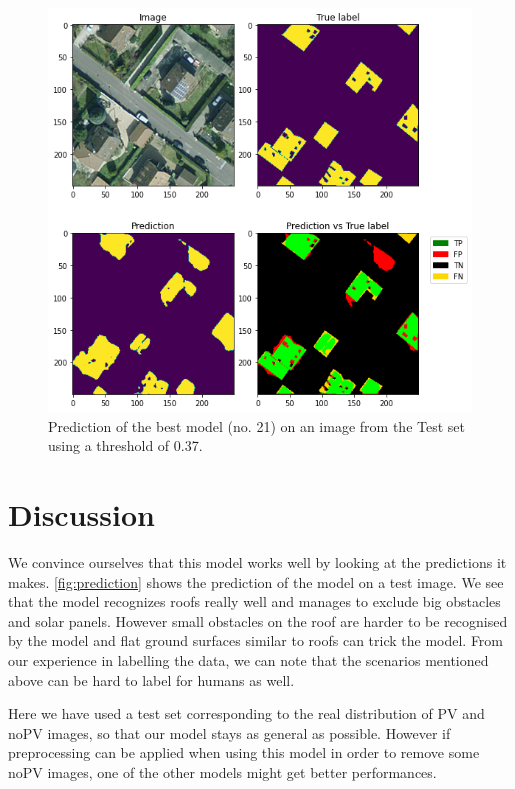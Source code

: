 \documentclass[10pt,conference]{IEEEtran}
\begin{document}
\begin{figure}[tbp]
    \centering
    \includegraphics[width=\columnwidth]{report/images/prediction.png}
    \caption{Prediction of the best model (no. 21) on an image from the Test set using a threshold of 0.37.}
    \label{fig:prediction}
\end{figure}

\section{Discussion}
We convince ourselves that this model works well by looking at the predictions it makes. \autoref{fig:prediction} shows the prediction of the model on a test image.
We see that the model recognizes roofs really well and manages to exclude big obstacles and solar panels. However small obstacles on the roof are harder to be recognised by the model and flat ground surfaces similar to roofs can trick the model. From our experience in labelling the data, we can note that the scenarios mentioned above can be hard to label for humans as well.

Here we have used a test set corresponding to the real distribution of PV and noPV images, so that our model stays as general as possible. However if preprocessing can be applied when using this model in order to remove some noPV images, one of the other models might get better performances.
\end{document}
